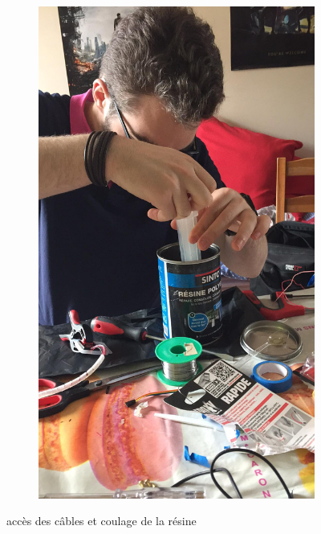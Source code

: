 \documentclass[a4paper,11pt]{report}
\begin{document}
\begin{figure}[!h]
\begin{subfigure}[b]{0.3\textwidth}
								\includegraphics[width=\textwidth]{Photos/Capture11.jpeg}
							\end{subfigure}
							\caption{accès des câbles et coulage de la résine }
					\end{figure}
			
\end{document}
